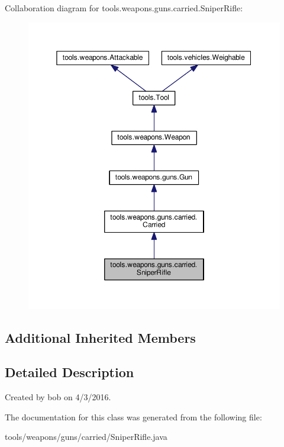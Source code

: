 Collaboration diagram for tools.\+weapons.\+guns.\+carried.\+Sniper\+Rifle\+:
\nopagebreak
\begin{figure}[H]
\begin{center}
\leavevmode
\includegraphics[width=350pt]{classtools_1_1weapons_1_1guns_1_1carried_1_1_sniper_rifle__coll__graph}
\end{center}
\end{figure}
\subsection*{Additional Inherited Members}


\subsection{Detailed Description}
Created by bob on 4/3/2016. 

The documentation for this class was generated from the following file\+:\begin{DoxyCompactItemize}
\item 
tools/weapons/guns/carried/Sniper\+Rifle.\+java\end{DoxyCompactItemize}
